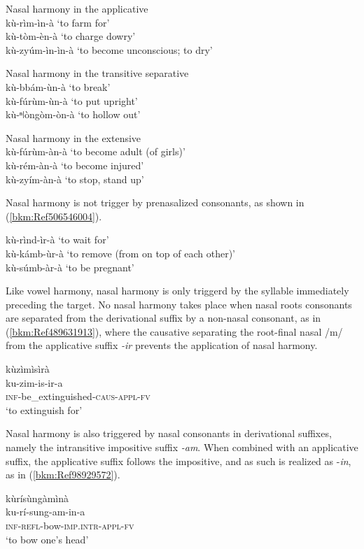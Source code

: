 \ea
\label{bkm:Ref98929486}
  Nasal harmony in the applicative\\
kù-rìm-ìn-à    ‘to farm for’\\
kù-tòm-èn-à    ‘to charge dowry’\\
kù-zyúm-ìn-ìn-à  ‘to become unconscious; to dry’
\z

\ea
\label{bkm:Ref98929502}
Nasal harmony in the transitive separative\\
kù-bbám-ùn-à  ‘to break’\\
kù-fúrùm-ùn-à  ‘to put upright’\\
kù-ⁿǀòngòm-òn-à  ‘to hollow out’
\z

\ea
\label{bkm:Ref98929515}
Nasal harmony in the extensive\\
kù-fúrùm-àn-à  ‘to become adult (of girls)’\\
kù-rém-àn-à    ‘to become injured’\\
kù-zyím-àn-à  ‘to stop, stand up’
\z

Nasal harmony is not trigger by prenasalized consonants, as shown in (\ref{bkm:Ref506546004}).

\ea
\label{bkm:Ref506546004}
kù-rìnd-ìr-à    ‘to wait for’\\
kù-kámb-ùr-à  ‘to remove (from on top of each other)’\\
kù-súmb-àr-à  ‘to be pregnant’
\z

Like vowel harmony, nasal harmony is only triggerd by the syllable immediately preceding the target. No nasal harmony takes place when nasal roots consonants are separated from the derivational suffix by a non-nasal consonant, as in (\ref{bkm:Ref489631913}), where the causative separating the root-final nasal /m/ from the applicative suffix \textit{-ir} prevents the application of nasal harmony.

\ea
\label{bkm:Ref489631913}
\glll kùzìmìsìrà\\
ku-zim-is-ir-a\\
\textsc{inf}-be\_extinguished-\textsc{caus}-\textsc{appl}-\textsc{fv}\\
\glt ‘to extinguish for’
\z

Nasal harmony is also triggered by nasal conso\-nants in derivational suffixes, namely the intransitive impositive suffix \textit{-am}. When com\-bined with an applicative suffix, the applicative suffix follows the impositive, and as such is real\-ized as \nobreakdash-\textit{in}, as in (\ref{bkm:Ref98929572}).

\ea
\label{bkm:Ref98929572}
\glll kùrísùngàmìnà\\
ku-rí-sung-am-in-a\\
\textsc{inf}-\textsc{refl}-bow-\textsc{imp}.\textsc{intr}-\textsc{appl}-\textsc{fv}\\
\glt ‘to bow one’s head’
\z

